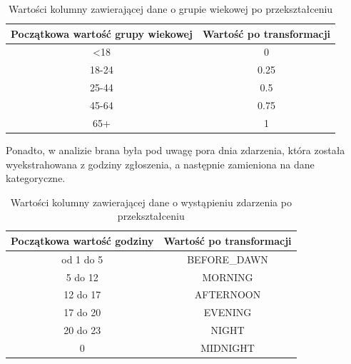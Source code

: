 \documentclass{classrep}
\begin{document}
{{{                \begin{table}[!htbp]
                    \small
                    \centering
                    \begin{tabular}{|c|c|}
                        \hline
                        Początkowa wartość grupy wiekowej & Wartość po transformacji \\ \hline
                        <18 & 0 \\
                        18-24 & 0.25 \\
                         25-44 & 0.5 \\
                        45-64 & 0.75 \\ 
                        65+ & 1 \\ \hline
                    \end{tabular}
                    \caption{Wartości kolumny zawierającej dane o grupie wiekowej po przekształceniu}
                    \label{trans_age}
                \end{table}
                \FloatBarrier
                
                Ponadto, w analizie brana była pod uwagę pora dnia zdarzenia, która została wyekstrahowana z godziny zgłoszenia, a następnie zamieniona na dane kategoryczne.
                
                \begin{table}[!htbp]
                    \small
                    \centering
                    \begin{tabular}{|c|c|}
                        \hline
                        Początkowa wartość godziny & Wartość po transformacji \\ \hline
                        od 1 do 5 & BEFORE\_DAWN \\
                        5 do 12 & MORNING \\
                         12 do 17 & AFTERNOON \\
                        17 do 20 & EVENING\\
                        20 do 23 & NIGHT\\ 
                        0 & MIDNIGHT \\ \hline
                    \end{tabular}
                    \caption{Wartości kolumny zawierającej dane o wystąpieniu zdarzenia po przekształceniu}
                    \label{trans_occurance}
                \end{table}
                \FloatBarrier
                
}}}
\end{document}
